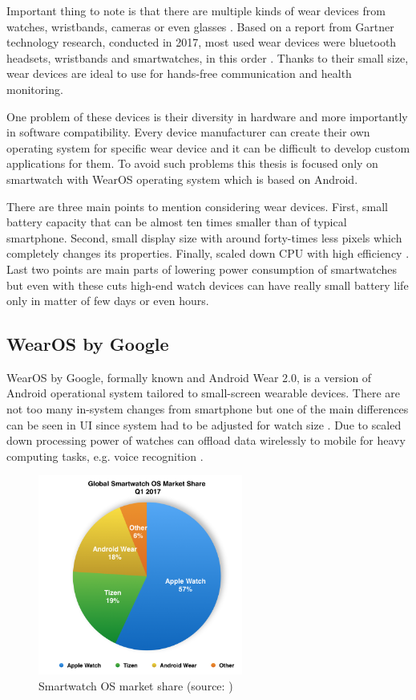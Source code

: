 Important thing to note is that there are multiple kinds of wear devices from watches, wristbands, cameras or even glasses \cite{MIWD}. Based on a report from Gartner technology research, conducted in 2017, most used wear devices were bluetooth headsets, wristbands and smartwatches, in this order \cite{GSWWDS}. Thanks to their small size, wear devices are ideal to use for hands-free communication and health monitoring.

One problem of these devices is their diversity in hardware and more importantly in software compatibility. Every device manufacturer can create their own operating system for specific wear device and it can be difficult to develop custom applications for them. To avoid such problems this thesis is focused only on smartwatch with WearOS operating system which is based on Android. 

There are three main points to mention considering wear devices. First, small battery capacity that can be almost ten times smaller than of typical smartphone. Second, small display size with around forty-times less pixels which completely changes its properties. Finally, scaled down CPU with high efficiency \cite{UtCoAWO}. Last two points are main parts of lowering power consumption of smartwatches but even with these cuts high-end watch devices can have really small battery life only in matter of few days or even hours.

\subsection{WearOS by Google}\label{sec:WearOS}
WearOS by Google, formally known and Android Wear 2.0, is a version of Android operational system tailored to small-screen wearable devices. There are not too many in-system changes from smartphone but one of the main differences can be seen in UI since system had to be adjusted for watch size \cite{CSUITW}. Due to scaled down processing power of watches can offload data wirelessly to mobile for heavy computing tasks, e.g. voice recognition \cite{UCAW}.

\begin{figure}[H]
	\begin{centering}
		\includegraphics[width=0.6\textwidth]{img/wear_market_share}
		\par\end{centering}
	\caption{Smartwatch OS market share (source: \cite{TOAW})\label{fig:SmartwatchOSMarketShare}}
	\label{fig02c04}
\end{figure}

